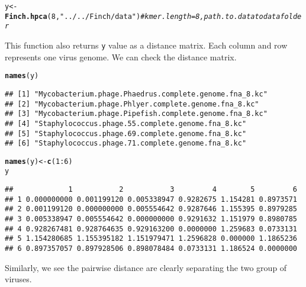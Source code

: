 \documentclass{article}\usepackage[]{graphicx}\usepackage[]{color}
\makeatletter
\newcommand{\hlnum}[1]{\textcolor[rgb]{0.686,0.059,0.569}{#1}}%
\newcommand{\hlstr}[1]{\textcolor[rgb]{0.192,0.494,0.8}{#1}}%
\newcommand{\hlcom}[1]{\textcolor[rgb]{0.678,0.584,0.686}{\textit{#1}}}%
\newcommand{\hlopt}[1]{\textcolor[rgb]{0,0,0}{#1}}%
\newcommand{\hlstd}[1]{\textcolor[rgb]{0.345,0.345,0.345}{#1}}%
\newcommand{\hlkwb}[1]{\textcolor[rgb]{0.69,0.353,0.396}{#1}}%
\newcommand{\hlkwd}[1]{\textcolor[rgb]{0.737,0.353,0.396}{\textbf{#1}}}%
\newenvironment{kframe}{%
 \def\at@end@of@kframe{}%
 \ifinner\ifhmode%
  \def\at@end@of@kframe{\end{minipage}}%
  \begin{minipage}{\columnwidth}%
 \fi\fi%
 \def\FrameCommand##1{\hskip\@totalleftmargin \hskip-\fboxsep
 \colorbox{shadecolor}{##1}\hskip-\fboxsep
     \hskip-\linewidth \hskip-\@totalleftmargin \hskip\columnwidth}%
 \MakeFramed {\advance\hsize-\width
   \@totalleftmargin\z@ \linewidth\hsize
   \@setminipage}}%
 {\par\unskip\endMakeFramed%
 \at@end@of@kframe}
\newenvironment{knitrout}{}{} %
\makeatother
\begin{document}
\begin{knitrout}
\color{fgcolor}\begin{kframe}
\begin{alltt}
\hlstd{y} \hlkwb{<-} \hlkwd{Finch.hpca}\hlstd{(}\hlnum{8}\hlstd{,}\hlstr{"../../Finch/data"}\hlstd{)} \hlcom{#kmer.length = 8, path.to.data to data folder}
\end{alltt}
\end{kframe}
\end{knitrout}

This function also  returns \texttt{y} value as a distance matrix. Each column and row represents one virus genome. We can check the distance matrix.

\begin{knitrout}
\color{fgcolor}\begin{kframe}
\begin{alltt}
\hlkwd{names}\hlstd{(y)}
\end{alltt}
\begin{verbatim}
## [1] "Mycobacterium.phage.Phaedrus.complete.genome.fna_8.kc"
## [2] "Mycobacterium.phage.Phlyer.complete.genome.fna_8.kc"  
## [3] "Mycobacterium.phage.Pipefish.complete.genome.fna_8.kc"
## [4] "Staphylococcus.phage.55.complete.genome.fna_8.kc"     
## [5] "Staphylococcus.phage.69.complete.genome.fna_8.kc"     
## [6] "Staphylococcus.phage.71.complete.genome.fna_8.kc"
\end{verbatim}
\begin{alltt}
\hlkwd{names}\hlstd{(y)} \hlkwb{<-} \hlkwd{c}\hlstd{(}\hlnum{1}\hlopt{:}\hlnum{6}\hlstd{)}
\hlstd{y}
\end{alltt}
\begin{verbatim}
##             1           2           3         4        5         6
## 1 0.000000000 0.001199120 0.005338947 0.9282675 1.154281 0.8973571
## 2 0.001199120 0.000000000 0.005554642 0.9287646 1.155395 0.8979285
## 3 0.005338947 0.005554642 0.000000000 0.9291632 1.151979 0.8980785
## 4 0.928267481 0.928764635 0.929163200 0.0000000 1.259683 0.0733131
## 5 1.154280685 1.155395182 1.151979471 1.2596828 0.000000 1.1865236
## 6 0.897357057 0.897928506 0.898078484 0.0733131 1.186524 0.0000000
\end{verbatim}
\end{kframe}
\end{knitrout}

Similarly, we see the pairwise distance are clearly separating the two group of viruses.\\
\end{document}
